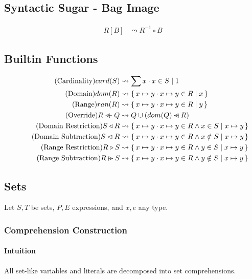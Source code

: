 \documentclass{article}
\newcommand{\bSet}[3]{%
  \{\, #1 \cdot #2 \mid #3 \, \}%
}
\begin{document}
\subsection{Syntactic Sugar - Bag Image}
\begin{align}
  \tag{Bag Image}
  R[B]
  &\leadsto
  R^{-1} \circ B
\end{align}
\subsection{Builtin Functions}

\noindent\begin{minipage}{\linewidth}
\begin{align}
  \tag{Cardinality}
  card(S)
  &\leadsto
  \sum x \cdot x \in S \mid 1
  \\
  \tag{Domain}
  dom(R)
  &\leadsto
  \bSet{x \mapsto y}{x \mapsto y \in R}{x}
  \\
  \tag{Range}
  ran(R)
  &\leadsto
  \bSet{x \mapsto y}{x \mapsto y \in R}{y}
  \\
  \tag{Override}
  R \ovl Q &\leadsto Q \cup (dom(Q) \domsub R)
  \\
  \tag{Domain Restriction}
  S \triangleleft R &\leadsto \bSet{x\mapsto y}{x \mapsto y \in R \land x \in S}{x \mapsto y}
  \\
  \tag{Domain Subtraction}
  S \domsub R &\leadsto \bSet{x\mapsto y}{x \mapsto y \in R \land x \notin S}{x \mapsto y}
  \\
  \tag{Range Restriction}
  R \triangleright S &\leadsto \bSet{x\mapsto y}{x \mapsto y \in R \land y \in S}{x \mapsto y}
  \\
  \tag{Range Subtraction}
  R \ransub S &\leadsto \bSet{x\mapsto y}{x \mapsto y \in R \land y \notin S}{x \mapsto y}
\end{align}
\end{minipage}
\subsection{Sets}

Let $S,T$ be sets, $P, E$ expressions, and $x, e$ any type.
\subsubsection{Comprehension Construction}

\paragraph{Intuition} All set-like variables and literals are decomposed into set comprehensions.
\end{document}
